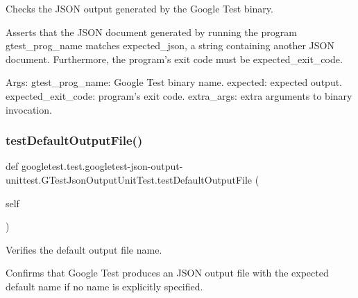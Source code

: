 \begin{DoxyVerb}Checks the JSON output generated by the Google Test binary.

Asserts that the JSON document generated by running the program
gtest_prog_name matches expected_json, a string containing another
JSON document.  Furthermore, the program's exit code must be
expected_exit_code.

Args:
  gtest_prog_name: Google Test binary name.
  expected: expected output.
  expected_exit_code: program's exit code.
  extra_args: extra arguments to binary invocation.
\end{DoxyVerb}
 \mbox{\label{classgoogletest_1_1test_1_1googletest-json-output-unittest_1_1_g_test_json_output_unit_test_a93504e8c8880e4b7e16c9994ff9c3c78}} 
\subsubsection{\texorpdfstring{testDefaultOutputFile()}{testDefaultOutputFile()}}
{\footnotesize\ttfamily def googletest.\+test.\+googletest-\/json-\/output-\/unittest.\+G\+Test\+Json\+Output\+Unit\+Test.\+test\+Default\+Output\+File (\begin{DoxyParamCaption}\item[{}]{self }\end{DoxyParamCaption})}

\begin{DoxyVerb}Verifies the default output file name.

Confirms that Google Test produces an JSON output file with the expected
default name if no name is explicitly specified.
\end{DoxyVerb}
 \mbox{\label{classgoogletest_1_1test_1_1googletest-json-output-unittest_1_1_g_test_json_output_unit_test_a3cb0c9384b8b8dbe731ecf77854859f8}} 
